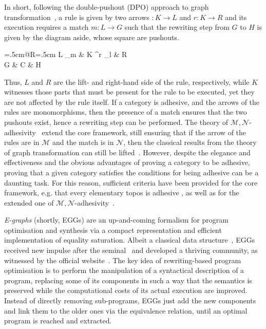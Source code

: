 \documentclass[a4paper,UKenglish,cleveref,pdftex,thm-restate,numberwithinsect]{lipics-v2021}
\begin{document}
\vspace{.1cm}
\noindent
\begin{minipage}[l]{.78\linewidth }In short, following the double-pushout (DPO) approach
to graph transformation~\cite{xxx}, a rule is given by two arrows $: K \to L$ and $r: K \rightarrow R$
and its execution requires a match $m: L \to G$ such that the rewriting step from $G$
to $H$ is given by the diagram aside, whose square are pushouts.
  \end{minipage}%
    \hfill
  \begin{minipage}[r]{.20\linewidth }
    \xymatrix@C=.5cm@R=.5cm{
      L \ar[d]_{m}
      & K \ar[r]^r \ar[l]_{l} \ar[d] & R \ar [d] \\
      G & C \ar[r] \ar[l]                    & H
    }
  \end{minipage}
\vspace{.1cm}

\noindent
Thus, $L$ and $R$ are the lift- and right-hand side of the rule, respectively, while $K$ witnesses those parts that must 
be present for the rule to be executed, yet they are not affected by the rule itself.
%
If a category is adhesive, and the arrows of the rules are monomorphisms, then the presence of a match ensures that the
two pushouts exist, hence a rewriting step can be performed.
%
The theory of $\mathcal{M}, \mathcal{N}$-adhesivity~\cite{xxx} extend the core framework, still ensuring that if the arrow 
of the rules are in $\mathcal{M}$ and the match is in $\mathcal{N}$, then the classical results from the theory of graph 
transformation can still be lifted~\cite{xxx}. 
%
However, despite the elegance and effectiveness and the obvious advantages of proving a category 
to be adhesive, proving that a given category satisfies the conditions 
for being adhesive can be a daunting task. For this reason,  sufficient criteria have been provided for the core 
framework, e.g. that every elementary topos is adhesive \cite{lack2006toposes}, as well as for the extended one of
$\mathcal{M}, \mathcal{N}$-adhesivity~\cite{CastelnovoGM24}.

\emph{E-graphs} (shortly, EGGs) are an up-and-coming formalism for program optimisation and synthesis via a compact 
representation and efficient implementation of equality saturation. 
%
Albeit a classical data structure~\cite{DetlefsNS05}, EGGs received 
new impulse after the seminal~\cite{WillseyNWFTP21} and
developed a thriving community, as witnessed by the official website~\cite{eggs}.
%
The key idea of rewriting-based program optimisation is to perform the manipulation of a syntactical description 
of a program, replacing some of its components in such a way that the semantics is preserved while 
the computational costs of its actual execution are improved. Instead of directly removing sub-programs, EGGs just add the 
new components and link them to the older ones via the equivalence relation, until an optimal program is 
reached and extracted.
\end{document}

